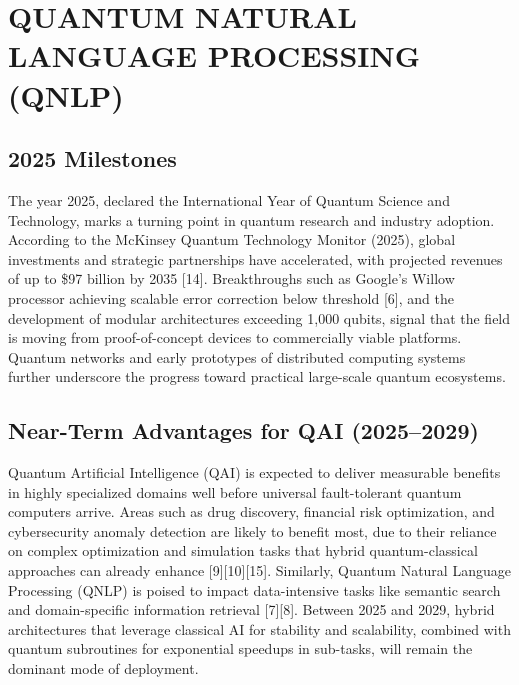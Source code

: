 \chapter{QUANTUM NATURAL LANGUAGE PROCESSING (QNLP)}
\section{2025 Milestones}
\hspace*{0.3in}The year 2025, declared the International Year of Quantum Science and Technology, marks a turning point in quantum research and industry adoption. According to the McKinsey Quantum Technology Monitor (2025), global investments and strategic partnerships have accelerated, with projected revenues of up to \$97 billion by 2035 [14]. Breakthroughs such as Google’s Willow processor achieving scalable error correction below threshold [6], and the development of modular architectures exceeding 1,000 qubits, signal that the field is moving from proof-of-concept devices to commercially viable platforms. Quantum networks and early prototypes of distributed computing systems further underscore the progress toward practical large-scale quantum ecosystems.
\section{Near-Term Advantages for QAI (2025–2029)}
\hspace*{0.3in}Quantum Artificial Intelligence (QAI) is expected to deliver measurable benefits in highly specialized domains well before universal fault-tolerant quantum computers arrive. Areas such as drug discovery, financial risk optimization, and cybersecurity anomaly detection are likely to benefit most, due to their reliance on complex optimization and simulation tasks that hybrid quantum-classical approaches can already enhance [9][10][15]. Similarly, Quantum Natural Language Processing (QNLP) is poised to impact data-intensive tasks like semantic search and domain-specific information retrieval [7][8]. Between 2025 and 2029, hybrid architectures that leverage classical AI for stability and scalability, combined with quantum subroutines for exponential speedups in sub-tasks, will remain the dominant mode of deployment.
